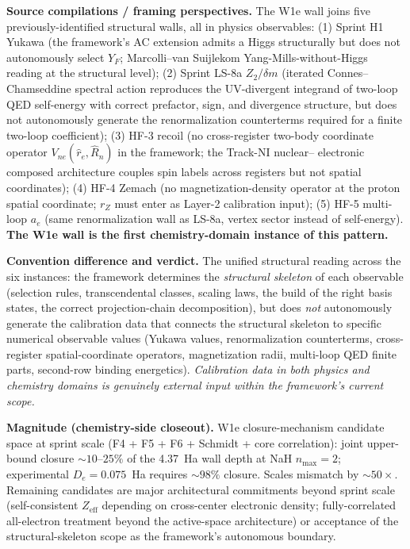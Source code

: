 \documentclass[11pt]{article}
\begin{document}
\textbf{Source compilations / framing perspectives.} The W1e wall
joins five previously-identified structural walls, all in physics
observables:
(1) Sprint H1 Yukawa (the framework's AC extension admits a Higgs
structurally but does not autonomously select $Y_F$; Marcolli--van
Suijlekom Yang-Mills-without-Higgs reading at the structural level);
(2) Sprint LS-8a $Z_2/\delta m$ (iterated Connes--Chamseddine
spectral action reproduces the UV-divergent integrand of two-loop
QED self-energy with correct prefactor, sign, and divergence
structure, but does not autonomously generate the renormalization
counterterms required for a finite two-loop coefficient);
(3) HF-3 recoil (no cross-register two-body coordinate operator
$V_{ne}(\hat r_e, \hat R_n)$ in the framework; the Track-NI nuclear--
electronic composed architecture couples spin labels across
registers but not spatial coordinates);
(4) HF-4 Zemach (no magnetization-density operator at the proton
spatial coordinate; $r_Z$ must enter as Layer-2 calibration input);
(5) HF-5 multi-loop $a_e$ (same renormalization wall as LS-8a,
vertex sector instead of self-energy).
\textbf{The W1e wall is the first chemistry-domain instance of this
pattern.}

\textbf{Convention difference and verdict.} The unified structural
reading across the six instances: the framework determines the
\emph{structural skeleton} of each observable (selection rules,
transcendental classes, scaling laws, the build of the right basis
states, the correct projection-chain decomposition), but does
\emph{not} autonomously generate the calibration data that connects
the structural skeleton to specific numerical observable values
(Yukawa values, renormalization counterterms, cross-register
spatial-coordinate operators, magnetization radii, multi-loop QED
finite parts, second-row binding energetics). \emph{Calibration
data in both physics and chemistry domains is genuinely external
input within the framework's current scope.}

\textbf{Magnitude (chemistry-side closeout).} W1e closure-mechanism
candidate space at sprint scale (F4 + F5 + F6 + Schmidt + core
correlation): joint upper-bound closure $\sim 10$--$25\%$ of the
4.37~Ha wall depth at NaH $n_{\max} = 2$; experimental $D_e =
0.075$~Ha requires $\sim 98\%$ closure. Scales mismatch by
$\sim 50\times$. Remaining candidates are major architectural
commitments beyond sprint scale (self-consistent $Z_\text{eff}$
depending on cross-center electronic density; fully-correlated
all-electron treatment beyond the active-space architecture) or
acceptance of the structural-skeleton scope as the framework's
autonomous boundary.
\end{document}
